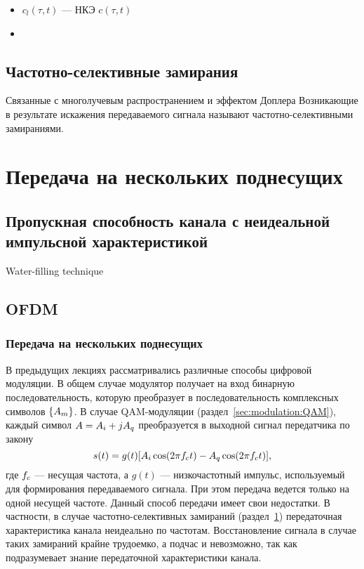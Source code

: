 \documentclass{book}
\numberwithin{theorem}{chapter}
\numberwithin{statement}{chapter}
\numberwithin{lemma}{chapter}
\theoremstyle{definition}
\numberwithin{task}{chapter}
\theoremstyle{remark}
\numberwithin{example}{chapter}
\theoremstyle{definition}
\numberwithin{definition}{chapter}
\theoremstyle{remark}
\theoremstyle{remark}
\numberwithin{lyrics}{section}
\begin{document}
\begin{itemize}
\item $c_l(\tau, t)$ --- НКЭ $c(\tau, t)$
\item 
\end{itemize}

\section{Частотно-селективные замирания}
\label{sec:channel:frequency_selective}
Связанные с многолучевым распространением и эффектом Доплера
Возникающие в результате искажения передаваемого сигнала называют частотно-селективными замираниями.



\chapter{Передача на нескольких поднесущих}

\section{Пропускная способность канала с неидеальной импульсной характеристикой}

Water-filling technique

\section{OFDM}

\subsection{Передача на нескольких поднесущих}

В предыдущих лекциях рассматривались различные способы цифровой модуляции. В общем случае модулятор получает на вход бинарную последовательность, которую преобразует в последовательность комплексных символов $\{A_m\}$. В случае QAM-модуляции (раздел~\ref{sec:modulation:QAM}), каждый символ $A = A_i + jA_q$ преобразуется в выходной сигнал передатчика по закону
\begin{equation}
s(t) = g(t)[A_{i}\cos(2\pi f_c t) - A_{q} \cos(2\pi f_c t)],
\end{equation} 
где $f_c$ --- несущая частота, а $g(t)$ --- низкочастотный импульс, используемый для формирования передаваемого сигнала. При этом передача ведется только на одной несущей частоте. Данный способ передачи имеет свои недостатки. В частности, в случае частотно-селективных замираний (раздел~\ref{sec:channel:frequency_selective}) передаточная характеристика канала неидеально по частотам. Восстановление сигнала в случае таких замираний крайне трудоемко, а подчас и невозможно, так как подразумевает знание передаточной характеристики канала. 
\end{document}
